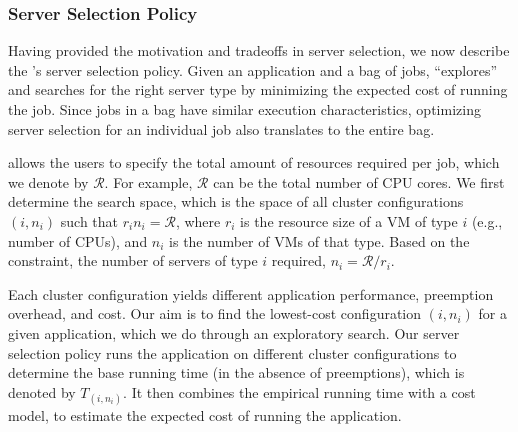 \subsubsection{Server Selection Policy}

Having provided the motivation and tradeoffs in server selection, we now describe the \sysname's server selection policy. 
Given an application and a bag of jobs, \sysname ``explores'' and searches for the right server type by minimizing the expected cost of running the job.
Since jobs in a bag have similar execution characteristics, optimizing server selection for an individual job also translates to the entire bag. 


\sysname allows the users to specify the total amount of resources required per job, which we denote by $\mathcal{R}$.
For example, $\mathcal{R}$ can be the total number of CPU cores. 
We first determine the search space, which is the space of all cluster configurations $(i,n_i)$ such that $r_i n_i = \mathcal{R}$, where $r_i$ is the resource size of a VM of type $i$ (e.g., number of CPUs), and $n_i$ is the number of VMs of that type. 
Based on the constraint, the number of servers of type $i$ required, $n_i = \mathcal{R}/r_i$.

Each cluster configuration yields different application performance, preemption overhead, and cost.
Our aim is to find the lowest-cost configuration $(i, n_i)$ for a given application, which we do through an exploratory search. 
Our server selection policy runs the application on different cluster configurations to determine the base running time (in the absence of preemptions), which is denoted by $T_{(i,n_i)}$. 
It then combines the empirical running time with a cost model, to estimate the expected cost of running the application. 

